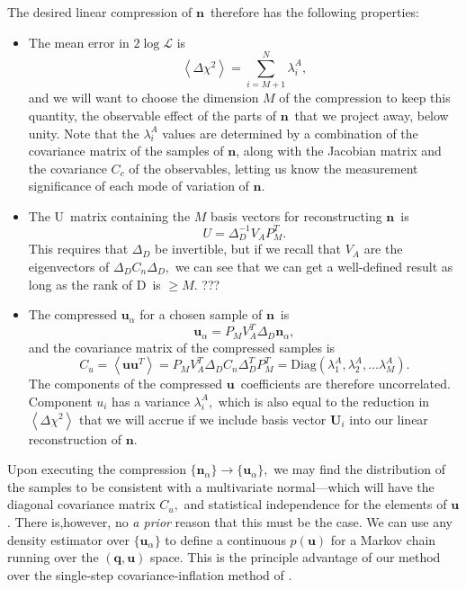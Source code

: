 \documentclass[linenumbers, onecolumn]{aastex63}
\newcommand{\vecq}{\ensuremath{\mathbf{q}}}
\newcommand{\vecn}{\ensuremath{\mathbf{n}}}
\newcommand{\vecu}{\ensuremath{\mathbf{u}}}
\newcommand{\covm}{C}
\newcommand{\matD}{D}
\newcommand{\matU}{U}
\newcommand{\matV}{V}
\newcommand{\proj}{P}  %
\newcommand{\DD}{\Delta_D}
\newcommand{\likeli}{\mathcal{L}}
\begin{document}
The desired linear compression of \vecn\ therefore has the following properties:
\begin{itemize}
\item The mean error in $2\log \likeli$ is
  \begin{equation}
    \left\langle \Delta\chi^2 \right \rangle = \sum_{i=M+1}^N
    \lambda^A_i,
  \end{equation}
  and we will want to choose the dimension $M$ of the compression to
  keep this quantity, the observable effect of the parts of \vecn\ that we 
  project away,  below unity.
  Note that the $\lambda^A_i$ values are determined by a combination of
  the covariance matrix of the samples of \vecn, along with the Jacobian
  matrix and the covariance $\covm_c$ of the observables, letting us
  know the measurement significance of each mode of variation of \vecn.

  \item The \matU\ matrix containing the $M$ basis vectors for
    reconstructing \vecn\ is
    \begin{equation}
      \matU = \DD^{-1} \matV_A \proj_M^T.
    \end{equation}
    This requires that $\DD$ be invertible, but if we recall that
    $\matV_A$ are the eigenvectors of $\DD \covm_n \DD,$ we can see
    that we can get a well-defined result as long as the rank of
    \matD\ is $\ge M$.  ???

  \item The compressed $\vecu_\alpha$ for a chosen sample of \vecn\ is
    \begin{equation}
      \vecu_\alpha = \proj_M \matV_A^T \DD \vecn_\alpha,
    \end{equation}
    and the covariance matrix of the compressed samples is
    \begin{equation}
      \covm_u = \left\langle \vecu \vecu^T \right\rangle = \proj_M
      \matV_A^T \DD \covm_n \DD^T \proj_M^T = \text{Diag}(\lambda^A_1,
      \lambda^A_2, \ldots \lambda^A_M).
    \end{equation}
The components of the compressed \vecu\ coefficients are therefore
uncorrelated.  Component $u_i$ has a variance
$\lambda^A_i,$ which is also equal to the reduction in $\left\langle
  \Delta \chi^2 \right\rangle$ that we will accrue if we include basis
vector $\mathbf{U}_i$ into our linear reconstruction of \vecn.
\end{itemize}


Upon executing the compression $\{\vecn_\alpha\} \rightarrow
\{\vecu_\alpha\},$ we may find the distribution of the samples to be
consistent with a multivariate normal---which will have the diagonal covariance
matrix $\covm_u,$ and statistical independence for the elements of
\vecu.
There is,however,  no \textit{a prior} reason that
this must be the case.  We can use any density estimator over
$\{\vecu_\alpha\}$ to define a continuous $p(\vecu)$ for a Markov
chain running over the $(\vecq,\vecu)$ space.  This is the principle
advantage of our method over the single-step covariance-inflation
method of \citet{hans}.
\end{document}
